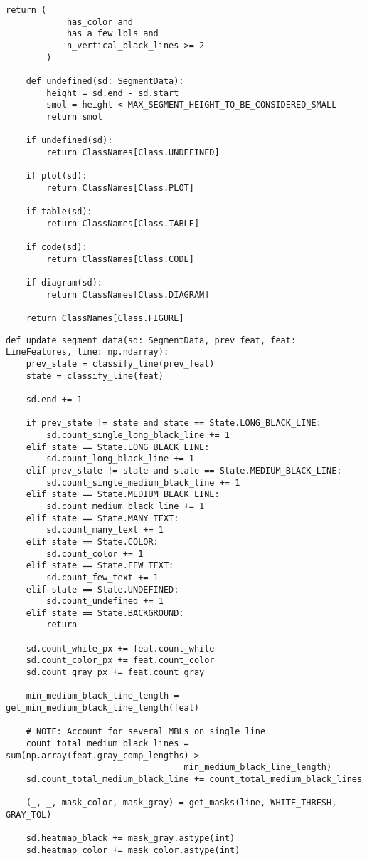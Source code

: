 \begin{lstlisting}[caption={Функция handle\_long\_black\_line}, label={lst:hlbl}]
        return (
            has_color and
            has_a_few_lbls and
            n_vertical_black_lines >= 2
        )

    def undefined(sd: SegmentData):
        height = sd.end - sd.start
        smol = height < MAX_SEGMENT_HEIGHT_TO_BE_CONSIDERED_SMALL
        return smol

    if undefined(sd):
        return ClassNames[Class.UNDEFINED]

    if plot(sd):
        return ClassNames[Class.PLOT]

    if table(sd):
        return ClassNames[Class.TABLE]

    if code(sd):
        return ClassNames[Class.CODE]

    if diagram(sd):
        return ClassNames[Class.DIAGRAM]

    return ClassNames[Class.FIGURE]
\end{lstlisting}

\begin{lstlisting}[caption={Функция обновления информации о сегменте}, label={lst:usd}]
def update_segment_data(sd: SegmentData, prev_feat, feat: LineFeatures, line: np.ndarray):
    prev_state = classify_line(prev_feat)
    state = classify_line(feat)

    sd.end += 1

    if prev_state != state and state == State.LONG_BLACK_LINE:
        sd.count_single_long_black_line += 1
    elif state == State.LONG_BLACK_LINE:
        sd.count_long_black_line += 1
    elif prev_state != state and state == State.MEDIUM_BLACK_LINE:
        sd.count_single_medium_black_line += 1
    elif state == State.MEDIUM_BLACK_LINE:
        sd.count_medium_black_line += 1
    elif state == State.MANY_TEXT:
        sd.count_many_text += 1
    elif state == State.COLOR:
        sd.count_color += 1
    elif state == State.FEW_TEXT:
        sd.count_few_text += 1
    elif state == State.UNDEFINED:
        sd.count_undefined += 1
    elif state == State.BACKGROUND:
        return

    sd.count_white_px += feat.count_white
    sd.count_color_px += feat.count_color
    sd.count_gray_px += feat.count_gray

    min_medium_black_line_length = get_min_medium_black_line_length(feat)

    # NOTE: Account for several MBLs on single line
    count_total_medium_black_lines = sum(np.array(feat.gray_comp_lengths) >
                                   min_medium_black_line_length)
    sd.count_total_medium_black_line += count_total_medium_black_lines

    (_, _, mask_color, mask_gray) = get_masks(line, WHITE_THRESH, GRAY_TOL)

    sd.heatmap_black += mask_gray.astype(int)
    sd.heatmap_color += mask_color.astype(int)
\end{lstlisting}

